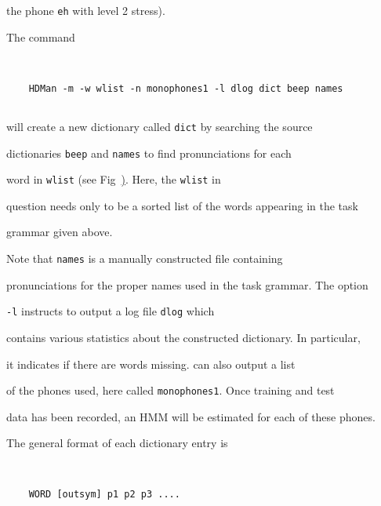 the phone \texttt{eh} with level 2 stress). 










\noindent


The command


\begin{verbatim}


    HDMan -m -w wlist -n monophones1 -l dlog dict beep names


\end{verbatim}


will create a new dictionary called \texttt{dict} by searching the source


dictionaries \texttt{beep} and \texttt{names} to find pronunciations for each


word in \texttt{wlist} (see Fig~\href{f:step2}). Here, the \texttt{wlist} in


question needs only to be a sorted list of the words appearing in the task


grammar given above.





Note that \texttt{names} is a manually constructed file containing


pronunciations for the proper names used in the task grammar. The option


\texttt{-l} instructs  to output a log file \texttt{dlog} which 


contains various statistics about the constructed dictionary. In particular,


it indicates if there are words missing.  can also output a list


of the phones used, here called \texttt{monophones1}. Once training and test


data has been recorded, an HMM will be estimated for each of these phones.





The general format of each dictionary entry is


\begin{verbatim}


    WORD [outsym] p1 p2 p3 ....


\end{verbatim}


